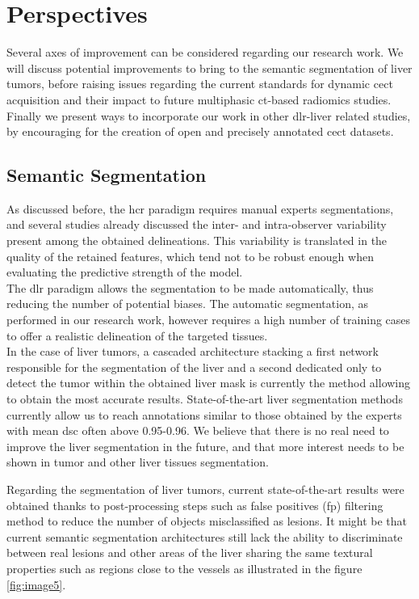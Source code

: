 \chapter{Perspectives}

Several axes of improvement can be considered regarding our research work.
We will discuss potential improvements to bring to the 
semantic segmentation of liver tumors, before raising issues regarding
the current standards for dynamic \ac{cect} acquisition and their impact to 
future multiphasic \ac{ct}-based radiomics studies.
Finally we present ways to incorporate our work in other \ac{dlr}-liver related 
studies, by encouraging for the creation of open and precisely 
annotated \ac{cect} datasets.

\section{Semantic Segmentation}

As discussed before, the \ac{hcr} paradigm requires manual experts
segmentations, and several studies already discussed the inter- and
intra-observer variability present among the obtained delineations. This
variability is translated in the quality of the retained features, which
tend not to be robust enough when evaluating the predictive 
strength of the model.\\
The \ac{dlr} paradigm allows the segmentation to be made automatically, thus
reducing the number of potential biases. The automatic segmentation, as
performed in our research work, however requires a high number of
training cases to offer a realistic delineation of the targeted tissues.\\
In the case of liver tumors, a cascaded architecture stacking a first
network responsible for the segmentation of the liver and a second
dedicated only to detect the tumor within the obtained liver mask is
currently the method allowing to obtain the most accurate results.
State-of-the-art liver segmentation methods currently allow us to reach
annotations similar to those obtained by the experts with mean \ac{dsc} often
above 0.95-0.96. We believe that there is no real need to improve the
liver segmentation in the future, and that more interest needs to be
shown in tumor and other liver tissues segmentation.

Regarding the segmentation of liver tumors, current state-of-the-art
results were obtained thanks to post-processing steps such as false
positives (\ac{fp}) filtering method to reduce the number of
objects misclassified as lesions.
It might be that current semantic segmentation architectures still lack the
ability to discriminate between real lesions and other areas of the liver sharing the
same textural properties such as regions close to the vessels as
illustrated in the figure \ref{fig:image5}.



